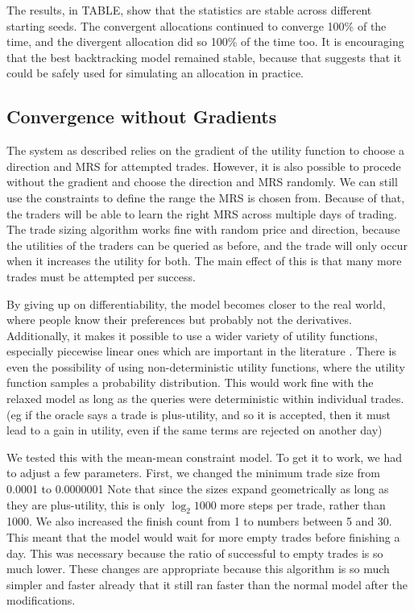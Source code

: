 \documentclass[12pt,a4paper,titlepage]{article}
\begin{document}
The results, in TABLE, show that the statistics are stable across different starting seeds.
The convergent allocations continued to converge 100\% of the time, and the divergent allocation did so 100\% of the time too.
It is encouraging that the best backtracking model remained stable, because that suggests that it could be safely used for simulating an allocation in practice.

\subsection{Convergence without Gradients}\label{nograd}
The system as described relies on the gradient of the utility function to choose a direction and MRS for attempted trades.
However, it is also possible to procede without the gradient and choose the direction and MRS randomly.
We can still use the constraints to define the range the MRS is chosen from.
Because of that, the traders will be able to learn the right MRS across multiple days of trading.
The trade sizing algorithm works fine with random price and direction, because the utilities of the traders can be queried as before, and the trade will only occur when it increases the utility for both.
The main effect of this is that many more trades must be attempted per success.

By giving up on differentiability, the model becomes closer to the real world, where people know their preferences but probably not the derivatives.
Additionally, it makes it possible to use a wider variety of utility functions, especially piecewise linear ones which are important in the literature \cite{chen}.
There is even the possibility of using non-deterministic utility functions, where the utility function samples a probability distribution.
This would work fine with the relaxed model as long as the queries were deterministic within individual trades.
(eg if the oracle says a trade is plus-utility, and so it is accepted, then it must lead to a gain in utility, even if the same terms are rejected on another day) 

We tested this with the mean-mean constraint model.
To get it to work, we had to adjust a few parameters. 
First, we changed the minimum trade size from 0.0001 to 0.0000001 
Note that since the sizes expand geometrically as long as they are plus-utility, this is only $\log_2 1000$ more steps per trade, rather than 1000.
We also increased the finish count from 1 to numbers between 5 and 30.
This meant that the model would wait for more empty trades before finishing a day.
This was necessary because the ratio of successful to empty trades is so much lower.
These changes are appropriate because this algorithm is so much simpler and faster already that it still ran faster than the normal model after the modifications.
\end{document}
